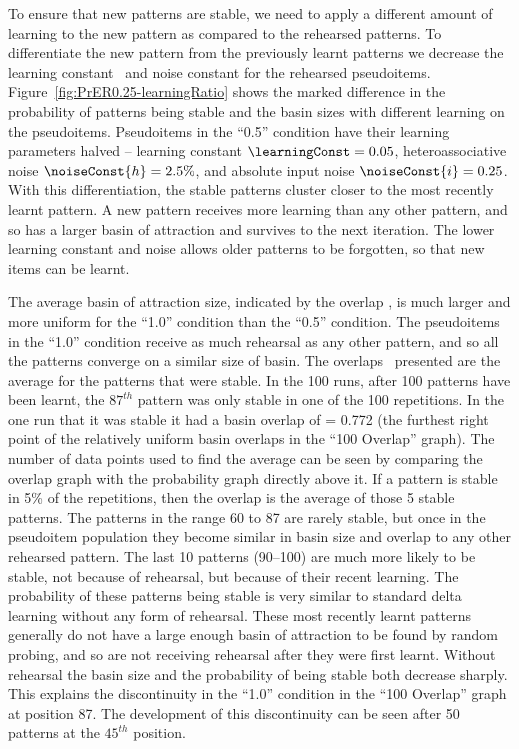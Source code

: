 To ensure that new patterns are stable, we need to apply a different amount of learning to the new pattern as compared to the rehearsed patterns.  To differentiate the new pattern from the previously learnt patterns we decrease the learning constant \learningConst\ and noise constant \noiseConst{} for the rehearsed pseudoitems. Figure~\ref{fig:PrER0.25-learningRatio} shows the marked difference in the probability of patterns being stable and the basin sizes with different learning on the pseudoitems.  Pseudoitems in the ``0.5'' condition have their learning parameters halved -- learning constant $\learningConst =0.05$, heteroassociative noise $\noiseConst{h} = 2.5\%$, and absolute input noise $\noiseConst{i} = 0.25$.  With this differentiation, the stable patterns cluster closer to the most recently learnt pattern.  A new pattern receives more learning than any other pattern, and so has a larger basin of attraction and survives to the next iteration.  The lower learning constant and noise allows older patterns to be forgotten, so that new items can be learnt.  

The average basin of attraction size, indicated by the overlap \overlap, is much larger and more uniform for the ``1.0'' condition than the ``0.5'' condition. The pseudoitems in the ``1.0'' condition receive as much rehearsal as any other pattern, and so all the patterns converge on a similar size of basin.  The overlaps \overlap\ presented are the average for the patterns that were stable.  In the 100 runs, after 100 patterns have been learnt, the $87^{th}$ pattern was only stable in one of the 100 repetitions.  In the one run that it was stable it had a basin overlap of \overlap = 0.772 (the furthest right point of the relatively uniform basin overlaps in the ``100 Overlap'' graph).  The number of data points used to find the average can be seen by comparing the overlap graph with the probability graph directly above it.  If a pattern is stable in 5\% of the repetitions, then the overlap is the average of those 5 stable patterns.  The patterns in the range 60 to 87 are rarely stable, but once in the pseudoitem population they become similar in basin size and overlap to any other rehearsed pattern.  The last 10 patterns (90--100) are much more likely to be stable, not because of rehearsal, but because of their recent learning.  The probability of these patterns being stable is very similar to standard delta learning without any form of rehearsal.  These most recently learnt patterns generally do not have a large enough basin of attraction to be found by random probing, and so are not receiving rehearsal after they were first learnt.  Without rehearsal the basin size and the probability of being stable both decrease sharply.  This explains the discontinuity in the ``1.0'' condition in the ``100 Overlap'' graph at position 87.  The development of this discontinuity can be seen after 50 patterns at the $45^{th}$ position. 


